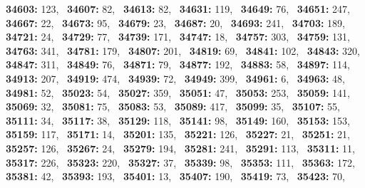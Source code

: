 \textbf{34603:} 123,\allowbreak~ 
\textbf{34607:} 82,\allowbreak~ 
\textbf{34613:} 82,\allowbreak~ 
\textbf{34631:} 119,\allowbreak~ 
\textbf{34649:} 76,\allowbreak~ 
\textbf{34651:} 247,\allowbreak~ 
\textbf{34667:} 22,\allowbreak~ 
\textbf{34673:} 95,\allowbreak~ 
\textbf{34679:} 23,\allowbreak~ 
\textbf{34687:} 20,\allowbreak~ 
\textbf{34693:} 241,\allowbreak~ 
\textbf{34703:} 189,\allowbreak~ 
\textbf{34721:} 24,\allowbreak~ 
\textbf{34729:} 77,\allowbreak~ 
\textbf{34739:} 171,\allowbreak~ 
\textbf{34747:} 18,\allowbreak~ 
\textbf{34757:} 303,\allowbreak~ 
\textbf{34759:} 131,\allowbreak~ 
\textbf{34763:} 341,\allowbreak~ 
\textbf{34781:} 179,\allowbreak~ 
\textbf{34807:} 201,\allowbreak~ 
\textbf{34819:} 69,\allowbreak~ 
\textbf{34841:} 102,\allowbreak~ 
\textbf{34843:} 320,\allowbreak~ 
\textbf{34847:} 311,\allowbreak~ 
\textbf{34849:} 76,\allowbreak~ 
\textbf{34871:} 79,\allowbreak~ 
\textbf{34877:} 192,\allowbreak~ 
\textbf{34883:} 58,\allowbreak~ 
\textbf{34897:} 114,\allowbreak~ 
\textbf{34913:} 207,\allowbreak~ 
\textbf{34919:} 474,\allowbreak~ 
\textbf{34939:} 72,\allowbreak~ 
\textbf{34949:} 399,\allowbreak~ 
\textbf{34961:} 6,\allowbreak~ 
\textbf{34963:} 48,\allowbreak~ 
\textbf{34981:} 52,\allowbreak~ 
\textbf{35023:} 54,\allowbreak~ 
\textbf{35027:} 359,\allowbreak~ 
\textbf{35051:} 47,\allowbreak~ 
\textbf{35053:} 253,\allowbreak~ 
\textbf{35059:} 141,\allowbreak~ 
\textbf{35069:} 32,\allowbreak~ 
\textbf{35081:} 75,\allowbreak~ 
\textbf{35083:} 53,\allowbreak~ 
\textbf{35089:} 417,\allowbreak~ 
\textbf{35099:} 35,\allowbreak~ 
\textbf{35107:} 55,\allowbreak~ 
\textbf{35111:} 34,\allowbreak~ 
\textbf{35117:} 38,\allowbreak~ 
\textbf{35129:} 118,\allowbreak~ 
\textbf{35141:} 98,\allowbreak~ 
\textbf{35149:} 160,\allowbreak~ 
\textbf{35153:} 153,\allowbreak~ 
\textbf{35159:} 117,\allowbreak~ 
\textbf{35171:} 14,\allowbreak~ 
\textbf{35201:} 135,\allowbreak~ 
\textbf{35221:} 126,\allowbreak~ 
\textbf{35227:} 21,\allowbreak~ 
\textbf{35251:} 21,\allowbreak~ 
\textbf{35257:} 126,\allowbreak~ 
\textbf{35267:} 24,\allowbreak~ 
\textbf{35279:} 194,\allowbreak~ 
\textbf{35281:} 241,\allowbreak~ 
\textbf{35291:} 113,\allowbreak~ 
\textbf{35311:} 11,\allowbreak~ 
\textbf{35317:} 226,\allowbreak~ 
\textbf{35323:} 220,\allowbreak~ 
\textbf{35327:} 37,\allowbreak~ 
\textbf{35339:} 98,\allowbreak~ 
\textbf{35353:} 111,\allowbreak~ 
\textbf{35363:} 172,\allowbreak~ 
\textbf{35381:} 42,\allowbreak~ 
\textbf{35393:} 193,\allowbreak~ 
\textbf{35401:} 13,\allowbreak~ 
\textbf{35407:} 190,\allowbreak~ 
\textbf{35419:} 73,\allowbreak~ 
\textbf{35423:} 70,\allowbreak~ 
